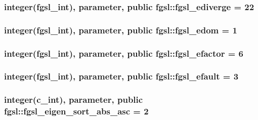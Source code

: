 \subsubsection[{fgsl\+\_\+ediverge}]{\setlength{\rightskip}{0pt plus 5cm}integer({\bf fgsl\+\_\+int}), parameter, public fgsl\+::fgsl\+\_\+ediverge = 22}\label{namespacefgsl_a955eb5c7585781ffb9e336843a471566}
\hypertarget{namespacefgsl_a4a331f3c353a431cb6975bbe8e0cbf63}{}
\subsubsection[{fgsl\+\_\+edom}]{\setlength{\rightskip}{0pt plus 5cm}integer({\bf fgsl\+\_\+int}), parameter, public fgsl\+::fgsl\+\_\+edom = 1}\label{namespacefgsl_a4a331f3c353a431cb6975bbe8e0cbf63}
\hypertarget{namespacefgsl_a027973d6b14562a967273973aed85e4f}{}
\subsubsection[{fgsl\+\_\+efactor}]{\setlength{\rightskip}{0pt plus 5cm}integer({\bf fgsl\+\_\+int}), parameter, public fgsl\+::fgsl\+\_\+efactor = 6}\label{namespacefgsl_a027973d6b14562a967273973aed85e4f}
\hypertarget{namespacefgsl_a3866fec8a527d4830fa9b88464c52417}{}
\subsubsection[{fgsl\+\_\+efault}]{\setlength{\rightskip}{0pt plus 5cm}integer({\bf fgsl\+\_\+int}), parameter, public fgsl\+::fgsl\+\_\+efault = 3}\label{namespacefgsl_a3866fec8a527d4830fa9b88464c52417}
\hypertarget{namespacefgsl_a5cf81e4e6e4b769e96ca69bea62e2d14}{}
\subsubsection[{fgsl\+\_\+eigen\+\_\+sort\+\_\+abs\+\_\+asc}]{\setlength{\rightskip}{0pt plus 5cm}integer(c\+\_\+int), parameter, public fgsl\+::fgsl\+\_\+eigen\+\_\+sort\+\_\+abs\+\_\+asc = 2}\label{namespacefgsl_a5cf81e4e6e4b769e96ca69bea62e2d14}
\hypertarget{namespacefgsl_a0ed0d4f25aa5ae03cb6adfe004cf648e}{}
